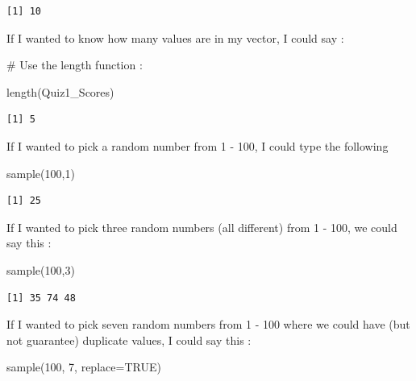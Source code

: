 \documentclass[
  letterpaper,
  DIV=11,
  numbers=noendperiod]{scrreprt}
\newenvironment{Shaded}{\begin{snugshade}}{\end{snugshade}}
\newcommand{\AttributeTok}[1]{\textcolor[rgb]{0.40,0.45,0.13}{#1}}
\newcommand{\CommentTok}[1]{\textcolor[rgb]{0.37,0.37,0.37}{#1}}
\newcommand{\ConstantTok}[1]{\textcolor[rgb]{0.56,0.35,0.01}{#1}}
\newcommand{\DecValTok}[1]{\textcolor[rgb]{0.68,0.00,0.00}{#1}}
\newcommand{\FunctionTok}[1]{\textcolor[rgb]{0.28,0.35,0.67}{#1}}
\newcommand{\NormalTok}[1]{\textcolor[rgb]{0.00,0.23,0.31}{#1}}
\begin{document}
\begin{verbatim}
[1] 10
\end{verbatim}

If I wanted to know how many values are in my vector, I could say :

\begin{Shaded}
\begin{Highlighting}[]
\CommentTok{\# Use the length function :}

\FunctionTok{length}\NormalTok{(Quiz1\_Scores)}
\end{Highlighting}
\end{Shaded}

\begin{verbatim}
[1] 5
\end{verbatim}

If I wanted to pick a random number from 1 - 100, I could type the
following

\begin{Shaded}
\begin{Highlighting}[]
\FunctionTok{sample}\NormalTok{(}\DecValTok{100}\NormalTok{,}\DecValTok{1}\NormalTok{)}
\end{Highlighting}
\end{Shaded}

\begin{verbatim}
[1] 25
\end{verbatim}

If I wanted to pick three random numbers (all different) from 1 - 100,
we could say this :

\begin{Shaded}
\begin{Highlighting}[]
\FunctionTok{sample}\NormalTok{(}\DecValTok{100}\NormalTok{,}\DecValTok{3}\NormalTok{)}
\end{Highlighting}
\end{Shaded}

\begin{verbatim}
[1] 35 74 48
\end{verbatim}

If I wanted to pick seven random numbers from 1 - 100 where we could
have (but not guarantee) duplicate values, I could say this :

\begin{Shaded}
\begin{Highlighting}[]
\FunctionTok{sample}\NormalTok{(}\DecValTok{100}\NormalTok{, }\DecValTok{7}\NormalTok{, }\AttributeTok{replace=}\ConstantTok{TRUE}\NormalTok{)}
\end{Highlighting}
\end{Shaded}
\end{document}
